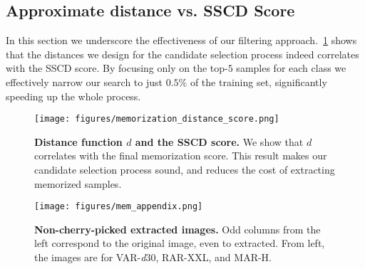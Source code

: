 \subsection{Approximate distance vs. SSCD Score}
\label{app:more_memorization_distance}

In this section we underscore the effectiveness of our filtering approach.~\cref{fig:distance_vs_sscd} shows that the distances we design for the candidate selection process indeed correlates with the SSCD score. By focusing only on the top-$5$ samples for each class we effectively narrow our search to just $0.5\%$ of the training set, significantly speeding up the whole process.

\begin{figure}[h]
    \centering
    \texttt{[image: figures/memorization\_distance\_score.png]}
    \caption{\textbf{Distance function $d$ and the SSCD score.} We show that $d$ correlates with the final memorization score. This result makes our candidate selection process sound, and reduces the cost of extracting memorized samples.}
    \label{fig:distance_vs_sscd}
\end{figure}

\begin{figure}
    \centering
    \texttt{[image: figures/mem\_appendix.png]}
    \caption{\textbf{Non-cherry-picked extracted images.} Odd columns from the left correspond to the original image, even to extracted. From left, the images are for VAR-\textit{d}30, RAR-XXL, and MAR-H.}
    \label{fig:more_memorization}
\end{figure}
